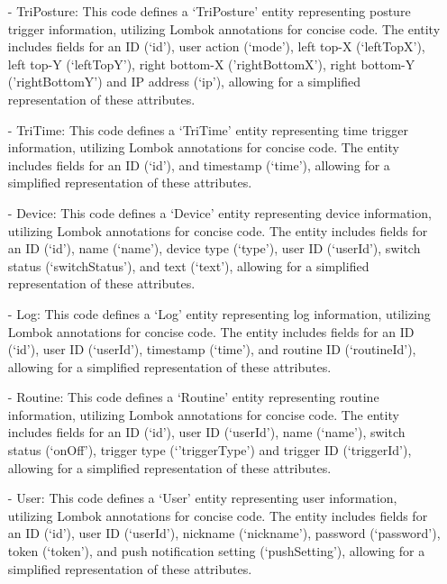 \begin{enumerate}[label=\arabic*]
\begin{enumerate}[label=\alph*]
\begin{enumerate}
                \item[-] TriPosture: This code defines a ‘TriPosture' entity representing posture trigger information, utilizing Lombok annotations for concise code. The entity includes fields for an ID (‘id’), user action (‘mode’), left top-X (‘leftTopX’), left top-Y (‘leftTopY’), right bottom-X ('rightBottomX'), right bottom-Y ('rightBottomY') and IP address (‘ip’), allowing for a simplified representation of these attributes. \\
                \item[-] TriTime: This code defines a ‘TriTime' entity representing time trigger information, utilizing Lombok annotations for concise code. The entity includes fields for an ID (‘id’), and timestamp (‘time’), allowing for a simplified representation of these attributes.\\
                \item[-] Device: This code defines a ‘Device' entity representing device information, utilizing Lombok annotations for concise code. The entity includes fields for an ID (‘id’), name (‘name’), device type (‘type’), user ID (‘userId’), switch status (‘switchStatus’), and text (‘text’), allowing for a simplified representation of these attributes.\\
                \item[-] Log: This code defines a ‘Log' entity representing log information, utilizing Lombok annotations for concise code. The entity includes fields for an ID (‘id’), user ID (‘userId’), timestamp (‘time’), and routine ID (‘routineId’), allowing for a simplified representation of these attributes. \\
                \item[-] Routine: This code defines a ‘Routine' entity representing routine information, utilizing Lombok annotations for concise code. The entity includes fields for an ID (‘id’), user ID (‘userId’), name (‘name’), switch status (‘onOff’), trigger type (‘’triggerType’) and trigger ID (‘triggerId’), allowing for a simplified representation of these attributes.\\
                \item[-] User: This code defines a ‘User' entity representing user information, utilizing Lombok annotations for concise code. The entity includes fields for an ID (‘id’), user ID (‘userId’), nickname (‘nickname’), password (‘password’), token (‘token’), and push notification setting (‘pushSetting’), allowing for a simplified representation of these attributes.\\

\end{enumerate}
\end{enumerate}
\end{enumerate}
